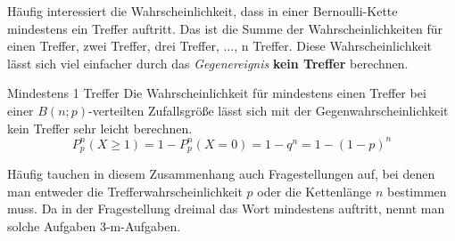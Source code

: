 Häufig interessiert die Wahrscheinlichkeit, dass in einer Bernoulli-Kette mindestens ein Treffer auftritt. Das ist die Summe der Wahrscheinlichkeiten für einen Treffer, zwei Treffer, drei Treffer, \(\ldots\),  n Treffer. Diese Wahrscheinlichkeit lässt sich viel einfacher durch das \textit{Gegenereignis} \textbf{kein Treffer} berechnen.
\begin{satz}{Mindestens 1 Treffer}{}
    Die Wahrscheinlichkeit für mindestens einen Treffer bei einer \(B(n;p)\)-verteilten Zufallsgröße lässt sich mit der Gegenwahrscheinlichkeit kein Treffer sehr leicht berechnen. \[P_p^n(X\geq 1) = 1- P_p^n(X=0) = 1-q^n = 1- \left(1-p\right)^n\]
\end{satz}
Häufig tauchen in diesem Zusammenhang auch Fragestellungen auf, bei denen man entweder die Trefferwahrscheinlichkeit \(p\) oder die Kettenlänge \(n\) bestimmen muss. Da in der Fragestellung dreimal das Wort mindestens auftritt, nennt man solche Aufgaben 3-m-Aufgaben. 
